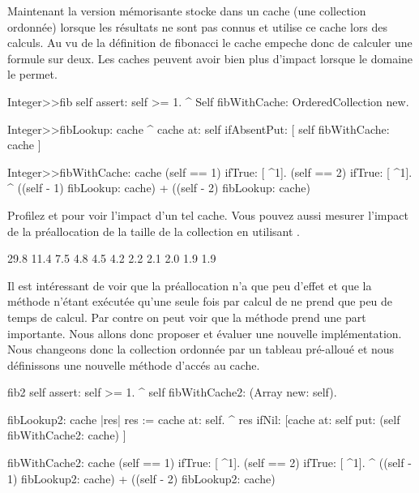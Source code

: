 \documentclass[a4paper,10pt,twoside]{book}
\begin{document}
Maintenant la version m\'emorisante stocke dans un cache (une collection ordonn\'ee) 
lorsque les r\'esultats ne sont pas connus  et utilise
ce cache lors des calculs. Au vu de la d\'efinition de fibonacci le
cache empeche donc de calculer une formule sur deux. Les caches peuvent
avoir bien plus d'impact lorsque le domaine
le permet. 
      
\begin{code}{}
Integer>>fib
	self assert: self >= 1.
	^ Self fibWithCache: OrderedCollection new.

Integer>>fibLookup: cache
	^ cache at: self ifAbsentPut: [ self fibWithCache: cache ] 

Integer>>fibWithCache: cache
	(self == 1) ifTrue: [ ^1].
	(self == 2) ifTrue: [ ^1].
	^ ((self - 1) fibLookup: cache) + ((self - 2) fibLookup: cache)
\end{code}

Profilez  et  pour voir l'impact d'un tel
cache. Vous pouvez aussi mesurer l'impact de la pr\'eallocation de la
taille de la collection en utilisant .

\begin{code}{}
29.8%
11.4%
7.5%
4.8%
4.5%
4.2%
2.2%
2.1%
2.0%
1.9%
1.9%
\end{code}

Il est int\'eressant de voir que la pr\'eallocation n'a que peu
d'effet et que la m\'ethode  n'\'etant ex\'ecut\'ee
qu'une seule fois par calcul de  ne prend que peu de temps de
calcul. Par contre on peut voir que la m\'ethode  
prend une part importante. Nous allons donc proposer et \'evaluer une
 nouvelle impl\'ementation. Nous changeons donc la collection
 ordonn\'ee par un tableau pr\'e-allou\'e et nous d\'efinissons une
 nouvelle m\'ethode d'acc\'es au cache. 



\begin{code}{}
fib2
	self assert: self >= 1.
	^ self fibWithCache2: (Array new: self).

fibLookup2: cache
	|res|
	res := cache at: self.
	^ res ifNil: [cache at: self put: (self fibWithCache2: cache) ]
		
fibWithCache2: cache
 	(self == 1) ifTrue: [ ^1].
 	(self == 2) ifTrue: [ ^1].
 	^ ((self - 1) fibLookup2: cache) + ((self - 2) fibLookup2: cache)
\end{code}
\end{document}
